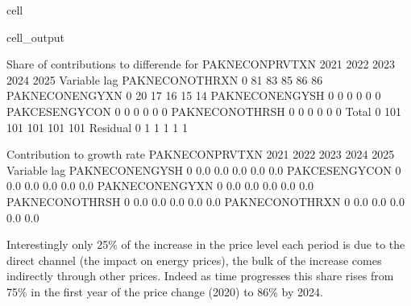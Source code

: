 \documentclass[letterpaper,10pt,english]{jupyterBook}
\begin{document}
\begin{sphinxuseclass}{cell}
\begin{sphinxVerbatimOutput}
\begin{sphinxuseclass}{cell_output}
\begin{sphinxVerbatim}[commandchars=\\\{\}]
 Share of contributions to differende for  PAKNECONPRVTXN
                          2021        2022        2023        2024        2025
Variable       lag                                                            
PAKNECONOTHRXN 0           81\PYGZpc{}         83\PYGZpc{}         85\PYGZpc{}         86\PYGZpc{}         86\PYGZpc{}
PAKNECONENGYXN 0           20\PYGZpc{}         17\PYGZpc{}         16\PYGZpc{}         15\PYGZpc{}         14\PYGZpc{}
PAKNECONENGYSH 0           \PYGZhy{}0\PYGZpc{}         \PYGZhy{}0\PYGZpc{}         \PYGZhy{}0\PYGZpc{}         \PYGZhy{}0\PYGZpc{}         \PYGZhy{}0\PYGZpc{}
PAKCESENGYCON  0           \PYGZhy{}0\PYGZpc{}         \PYGZhy{}0\PYGZpc{}         \PYGZhy{}0\PYGZpc{}         \PYGZhy{}0\PYGZpc{}         \PYGZhy{}0\PYGZpc{}
PAKNECONOTHRSH 0           \PYGZhy{}0\PYGZpc{}         \PYGZhy{}0\PYGZpc{}         \PYGZhy{}0\PYGZpc{}         \PYGZhy{}0\PYGZpc{}         \PYGZhy{}0\PYGZpc{}
Total          0          101\PYGZpc{}        101\PYGZpc{}        101\PYGZpc{}        101\PYGZpc{}        101\PYGZpc{}
Residual       0            1\PYGZpc{}          1\PYGZpc{}          1\PYGZpc{}          1\PYGZpc{}          1\PYGZpc{}

 Contribution to growth rate PAKNECONPRVTXN
                          2021        2022        2023        2024        2025
Variable       lag                                                            
PAKNECONENGYSH 0         \PYGZhy{}0.0\PYGZpc{}       \PYGZhy{}0.0\PYGZpc{}       \PYGZhy{}0.0\PYGZpc{}       \PYGZhy{}0.0\PYGZpc{}       \PYGZhy{}0.0\PYGZpc{}
PAKCESENGYCON  0         \PYGZhy{}0.0\PYGZpc{}       \PYGZhy{}0.0\PYGZpc{}       \PYGZhy{}0.0\PYGZpc{}       \PYGZhy{}0.0\PYGZpc{}       \PYGZhy{}0.0\PYGZpc{}
PAKNECONENGYXN 0          0.0\PYGZpc{}        0.0\PYGZpc{}        0.0\PYGZpc{}        0.0\PYGZpc{}        0.0\PYGZpc{}
PAKNECONOTHRSH 0         \PYGZhy{}0.0\PYGZpc{}       \PYGZhy{}0.0\PYGZpc{}       \PYGZhy{}0.0\PYGZpc{}       \PYGZhy{}0.0\PYGZpc{}       \PYGZhy{}0.0\PYGZpc{}
PAKNECONOTHRXN 0          0.0\PYGZpc{}        0.0\PYGZpc{}        0.0\PYGZpc{}        0.0\PYGZpc{}        0.0\PYGZpc{}
\end{sphinxVerbatim}

\end{sphinxuseclass}\end{sphinxVerbatimOutput}

\end{sphinxuseclass}
\sphinxAtStartPar
Interestingly only 25\% of the increase in the price level each period is due to the direct channel (the impact on energy prices), the bulk of the increase comes indirectly through other prices.  Indeed as time progresses this share rises from 75\% in the first year of the price change (2020) to 86\% by 2024.
\end{document}
